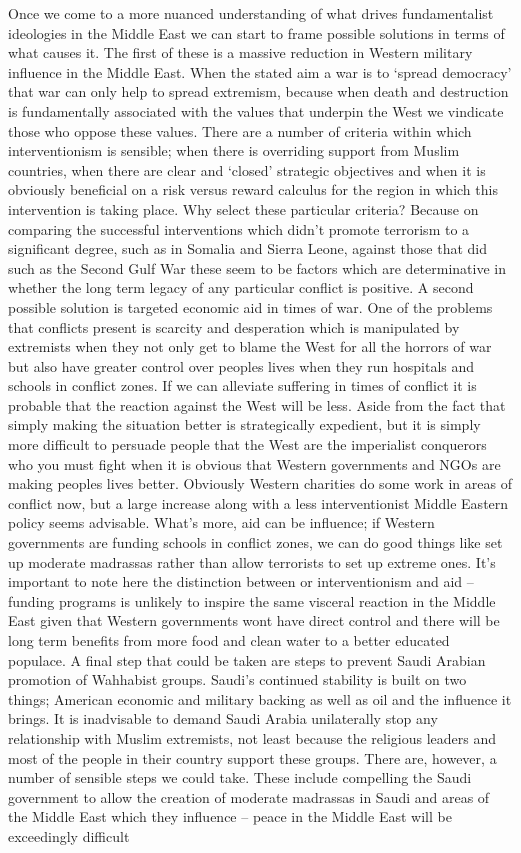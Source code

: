 \documentclass[10pt,a4paper]{article}
\newcounter{count}
\begin{document}
\begin{multicols}{2}
Once we come to a more nuanced understanding of what drives fundamentalist ideologies in the Middle East we can start to frame possible solutions in terms of what causes it. The first of these is a massive reduction in Western military influence in the Middle East. When the stated aim a war is to ‘spread democracy’ that war can only help to spread extremism, because when death and destruction is fundamentally associated with the values that underpin the West we vindicate those who oppose these values. There are a number of criteria within which interventionism is sensible; when there is overriding support from Muslim countries, when there are clear and ‘closed’ strategic objectives and when it is obviously beneficial on a risk versus reward calculus for the region in which this intervention is taking place. Why select these particular criteria? Because on comparing the successful interventions which didn’t promote terrorism to a significant degree, such as in Somalia and Sierra Leone, against those that did such as the Second Gulf War these seem to be factors which are determinative in whether the long term legacy of any particular conflict is positive. A second possible solution is targeted economic aid in times of war. One of the problems that conflicts present is scarcity and desperation which is manipulated by extremists when they not only get to blame the West for all the horrors of war but also have greater control over peoples lives when they run hospitals and schools in conflict zones. If we can alleviate suffering in times of conflict it is probable that the reaction against the West will be less. Aside from the fact that simply making the situation better is strategically expedient, but it is simply more difficult to persuade people that the West are the imperialist conquerors who you must fight when it is obvious that Western governments and NGOs are making peoples lives better.  Obviously Western charities do some work in areas of conflict now, but a large increase along with a less interventionist Middle Eastern policy seems advisable. What’s more, aid can be influence; if Western governments are funding schools in conflict zones, we can do good things like set up moderate madrassas rather than allow terrorists to set up extreme ones.  It’s important to note here the distinction between or interventionism and aid – funding programs is unlikely to inspire the same visceral reaction in the Middle East given that Western governments wont have direct control and there will be long term benefits from more food and clean water to a better educated populace. A final step that could be taken are steps to prevent Saudi Arabian promotion of Wahhabist groups. Saudi’s continued stability is built on two things; American economic and military backing as well as oil and the influence it brings. It is inadvisable to demand Saudi Arabia unilaterally stop any relationship with Muslim extremists, not least because the religious leaders and most of the people in their country support these groups. There are, however, a number of sensible steps we could take. These include compelling the Saudi government to allow the creation of moderate madrassas in Saudi and areas of the Middle East which they influence – peace in the Middle East will be exceedingly difficult 
\end{multicols}
\end{document}
